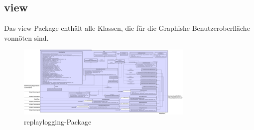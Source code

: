 \subsection{view}
\label{subsec:view}

Das view Package enthält alle Klassen, die für die Graphishe Benutzeroberfläche vonnöten sind.

\clearpage
\begin{figure}
  \centering
  \includegraphics[width=\textwidth]{../diagramimages/view.png}
  \caption{replaylogging-Package}
\end{figure}
\clearpage
